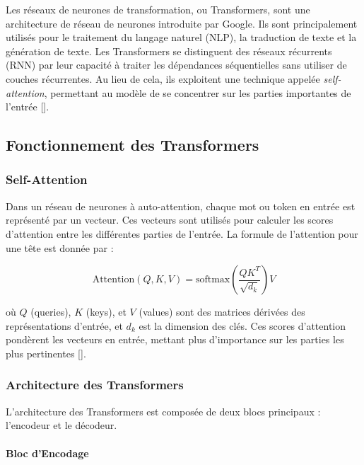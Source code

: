 Les réseaux de neurones de transformation, ou Transformers, sont une
architecture de réseau de neurones introduite par Google. Ils sont
principalement utilisés pour le traitement du langage naturel (NLP), la
traduction de texte et la génération de texte. Les Transformers se distinguent
des réseaux récurrents (RNN) par leur capacité à traiter les dépendances
séquentielles sans utiliser de couches récurrentes. Au lieu de cela, ils
exploitent une technique appelée \textit{self-attention}, permettant au modèle
de se concentrer sur les parties importantes de l'entrée
[\cite{attention_is_all_you_need}].

\subsection{Fonctionnement des Transformers}

\subsubsection{Self-Attention}

Dans un réseau de neurones à auto-attention, chaque mot ou token en entrée est
représenté par un vecteur. Ces vecteurs sont utilisés pour calculer les scores
d’attention entre les différentes parties de l’entrée. La formule de
l’attention pour une tête est donnée par :

\begin{equation}
	\text{Attention}(Q, K, V) = \text{softmax}\left(\frac{QK^T}{\sqrt{d_k}}\right)V
\end{equation}

où $Q$ (queries), $K$ (keys), et $V$ (values) sont des matrices dérivées des
représentations d'entrée, et $d_k$ est la dimension des clés. Ces scores
d'attention pondèrent les vecteurs en entrée, mettant plus d’importance sur les
parties les plus pertinentes [\cite{attention_is_all_you_need}].

\subsubsection{Architecture des Transformers}

L'architecture des Transformers est composée de deux blocs principaux :
l'encodeur et le décodeur.

\paragraph{Bloc d'Encodage}

